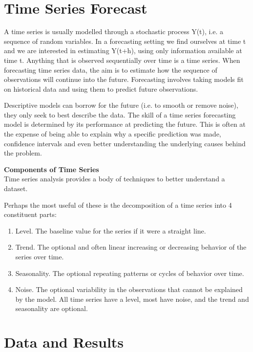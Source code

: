 \documentclass[12pt]{report}
\begin{document}
\section{Time Series Forecast}
  
A time series is usually modelled through a stochastic process Y(t), i.e. a sequence of random variables. In a forecasting setting we find ourselves at time t and we are interested in estimating Y(t+h), using only information available at time t.\cite{13}
Anything that is observed sequentially over time is a time series.
When forecasting time series data, the aim is to estimate how the sequence of observations will continue into the future.
Forecasting involves taking models fit on historical data and using them to predict future observations.

Descriptive models can borrow for the future (i.e. to smooth or remove noise), they only seek to best describe the data.
The skill of a time series forecasting model is determined by its performance at predicting the future. This is often at the expense of being able to explain why a specific prediction was made, confidence intervals and even better understanding the underlying causes behind the problem.

\textbf{Components of Time Series} \\
Time series analysis provides a body of techniques to better understand a dataset.

Perhaps the most useful of these is the decomposition of a time series into 4 constituent parts:

\begin{enumerate}
  \item Level. The baseline value for the series if it were a straight line.
  \item Trend. The optional and often linear increasing or decreasing behavior of the series over time.
  \item Seasonality. The optional repeating patterns or cycles of behavior over time.
  \item Noise. The optional variability in the observations that cannot be explained by the model.
All time series have a level, most have noise, and the trend and seasonality are optional.

\end{enumerate}

\section{Data and Results}
\end{document}
